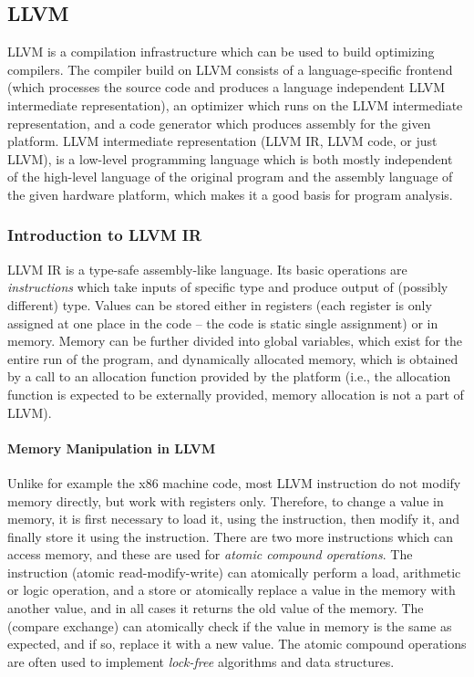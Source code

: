 \subsection{LLVM}

LLVM is a compilation infrastructure which can be used to build optimizing compilers.
The compiler build on LLVM consists of a language-specific frontend (which processes the source code and produces a language independent LLVM intermediate representation), an optimizer which runs on the LLVM intermediate representation, and a code generator which produces assembly for the given platform.
LLVM intermediate representation (LLVM IR, LLVM code, or just LLVM), is a low-level programming language which is both mostly independent of the high-level language of the original program and the assembly language of the given hardware platform, which makes it a good basis for program analysis.

\subsubsection{Introduction to LLVM IR}

LLVM IR is a type-safe assembly-like language.
Its basic operations are \emph{instructions} which take inputs of specific type and produce output of (possibly different) type.
Values can be stored either in registers (each register is only assigned at one place in the code -- the code is static single assignment) or in memory.
Memory can be further divided into global variables, which exist for the entire run of the program, and dynamically allocated memory, which is obtained by a call to an allocation function provided by the platform (i.e., the allocation function is expected to be externally provided, memory allocation is not a part of LLVM).

\paragraph{Memory Manipulation in LLVM}
Unlike for example the x86 machine code, most LLVM instruction do not modify memory directly, but work with registers only.
Therefore, to change a value in memory, it is first necessary to load it, using the  instruction, then modify it, and finally store it using the  instruction.
There are two more instructions which can access memory, and these are used for \emph{atomic compound operations}.
The  instruction (atomic read-modify-write) can atomically perform a load, arithmetic or logic operation, and a store or atomically replace a value in the memory with another value, and in all cases it returns the old value of the memory.
The  (compare exchange) can atomically check if the value in memory is the same as expected, and if so, replace it with a new value.
The atomic compound operations are often used to implement \emph{lock-free} algorithms and data structures.

